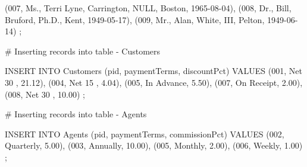 \documentclass[
  letterpaper,
  DIV=11,
  numbers=noendperiod]{scrreprt}
\newenvironment{Shaded}{\begin{snugshade}}{\end{snugshade}}
\newcommand{\CommentTok}[1]{\textcolor[rgb]{0.37,0.37,0.37}{#1}}
\newcommand{\ConstantTok}[1]{\textcolor[rgb]{0.56,0.35,0.01}{#1}}
\newcommand{\DecValTok}[1]{\textcolor[rgb]{0.68,0.00,0.00}{#1}}
\newcommand{\FloatTok}[1]{\textcolor[rgb]{0.68,0.00,0.00}{#1}}
\newcommand{\FunctionTok}[1]{\textcolor[rgb]{0.28,0.35,0.67}{#1}}
\newcommand{\NormalTok}[1]{\textcolor[rgb]{0.00,0.23,0.31}{#1}}
\newcommand{\StringTok}[1]{\textcolor[rgb]{0.13,0.47,0.30}{#1}}
\begin{document}
\begin{Shaded}
\begin{Highlighting}[]
\NormalTok{ (}\DecValTok{007}\NormalTok{, }\StringTok{\textquotesingle{}Ms.\textquotesingle{}}\NormalTok{, }\StringTok{\textquotesingle{}Terri Lyne\textquotesingle{}}\NormalTok{, }\StringTok{\textquotesingle{}Carrington\textquotesingle{}}\NormalTok{, }\ConstantTok{NULL}\NormalTok{, }\StringTok{\textquotesingle{}Boston\textquotesingle{}}\NormalTok{, }\StringTok{\textquotesingle{}1965{-}08{-}04\textquotesingle{}}\NormalTok{),}
\NormalTok{ (}\DecValTok{008}\NormalTok{, }\StringTok{\textquotesingle{}Dr.\textquotesingle{}}\NormalTok{, }\StringTok{\textquotesingle{}Bill\textquotesingle{}}\NormalTok{, }\StringTok{\textquotesingle{}Bruford\textquotesingle{}}\NormalTok{, }\StringTok{\textquotesingle{}Ph.D.\textquotesingle{}}\NormalTok{, }\StringTok{\textquotesingle{}Kent\textquotesingle{}}\NormalTok{, }\StringTok{\textquotesingle{}1949{-}05{-}17\textquotesingle{}}\NormalTok{),}
\NormalTok{ (}\DecValTok{009}\NormalTok{, }\StringTok{\textquotesingle{}Mr.\textquotesingle{}}\NormalTok{, }\StringTok{\textquotesingle{}Alan\textquotesingle{}}\NormalTok{, }\StringTok{\textquotesingle{}White\textquotesingle{}}\NormalTok{, }\StringTok{\textquotesingle{}III\textquotesingle{}}\NormalTok{, }\StringTok{\textquotesingle{}Pelton\textquotesingle{}}\NormalTok{, }\StringTok{\textquotesingle{}1949{-}06{-}14\textquotesingle{}}\NormalTok{)}
\NormalTok{;}

\CommentTok{\# Inserting records into table {-} Customers }

\NormalTok{INSERT INTO }\FunctionTok{Customers}\NormalTok{ (pid, paymentTerms, discountPct)}
\NormalTok{VALUES}
\NormalTok{ (}\DecValTok{001}\NormalTok{, }\StringTok{\textquotesingle{}Net 30\textquotesingle{}}\NormalTok{ , }\FloatTok{21.12}\NormalTok{),}
\NormalTok{ (}\DecValTok{004}\NormalTok{, }\StringTok{\textquotesingle{}Net 15\textquotesingle{}}\NormalTok{ , }\FloatTok{4.04}\NormalTok{),}
\NormalTok{ (}\DecValTok{005}\NormalTok{, }\StringTok{\textquotesingle{}In Advance\textquotesingle{}}\NormalTok{, }\FloatTok{5.50}\NormalTok{),}
\NormalTok{ (}\DecValTok{007}\NormalTok{, }\StringTok{\textquotesingle{}On Receipt\textquotesingle{}}\NormalTok{, }\FloatTok{2.00}\NormalTok{),}
\NormalTok{ (}\DecValTok{008}\NormalTok{, }\StringTok{\textquotesingle{}Net 30\textquotesingle{}}\NormalTok{ , }\FloatTok{10.00}\NormalTok{)}
\NormalTok{;}

\CommentTok{\# Inserting records into table {-} Agents }

\NormalTok{INSERT INTO }\FunctionTok{Agents}\NormalTok{ (pid, paymentTerms, commissionPct)}
\NormalTok{VALUES}
\NormalTok{ (}\DecValTok{002}\NormalTok{, }\StringTok{\textquotesingle{}Quarterly\textquotesingle{}}\NormalTok{, }\FloatTok{5.00}\NormalTok{),}
\NormalTok{ (}\DecValTok{003}\NormalTok{, }\StringTok{\textquotesingle{}Annually\textquotesingle{}}\NormalTok{, }\FloatTok{10.00}\NormalTok{),}
\NormalTok{ (}\DecValTok{005}\NormalTok{, }\StringTok{\textquotesingle{}Monthly\textquotesingle{}}\NormalTok{, }\FloatTok{2.00}\NormalTok{),}
\NormalTok{ (}\DecValTok{006}\NormalTok{, }\StringTok{\textquotesingle{}Weekly\textquotesingle{}}\NormalTok{, }\FloatTok{1.00}\NormalTok{)}
\NormalTok{;}


\end{Highlighting}
\end{Shaded}
\end{document}
